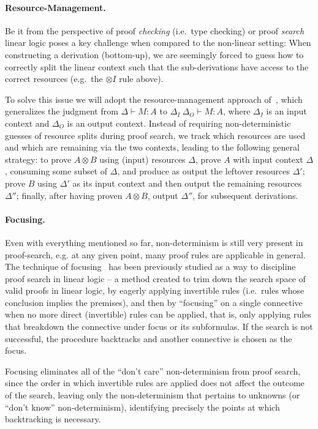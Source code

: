 \documentclass{llncs}
\newcommand{\tensor}{\otimes}
\newcommand{\mypara}[1]{\paragraph{\textbf{#1}.}}
\begin{document}
\mypara{Resource-Management}
Be it from the perspective of proof \emph{checking} (i.e.~type checking) or
proof \emph{search} linear logic poses a key challenge when compared
to the non-linear setting:
When constructing a derivation (bottom-up), we are seemingly forced to
guess how to correctly split the linear context such that the
sub-derivations have access to the correct resources (e.g.~the
$\tensor I$ rule above).
%
%

To solve this issue we will adopt the resource-management
approach
of~\cite{DBLP:journals/tcs/CervesatoHP00,DBLP:conf/lics/LiangM09},
which generalizes the judgment  from $\Delta \vdash M : A$ to
$\Delta_I \ \Delta_O \vdash M : A$, where $\Delta_I$ is an input
context and $\Delta_O$ is an output context.
Instead of requiring non-deterministic guesses of resource splits
during proof search, we track which resources are used and which are
remaining via the two contexts, leading to the following general strategy: to
prove $A\tensor B$ using (input) resources $\Delta$, prove $A$ with
input context $\Delta$,
consuming some subset of $\Delta$, and produce as output the leftover
resources $\Delta'$; prove $B$ using $\Delta'$ as its input context and then output the
remaining resources $\Delta''$; finally, after having proven
$A\tensor B$, output $\Delta''$, for subsequent derivations.


\mypara{Focusing}

Even with everything mentioned so far, non-determinism is still very
present in proof-search, e.g. at any given point, many proof
rules are applicable in general. The technique of focusing~\cite{10.1093/logcom/2.3.297,DBLP:conf/cade/ChaudhuriP05}
has been previously studied as a way to discipline proof search in
linear logic -- a method created to trim down the search space of
valid proofs in linear logic, by eagerly applying invertible rules
(i.e.~rules whose conclusion implies the premises), and then by
``focusing'' on a single connective when no more direct (invertible)
rules can be applied, that is, only applying rules that breakdown
the connective under focus or its subformulas. If the search is not
successful, the procedure backtracks and another connective is
chosen as the focus.

Focusing eliminates all of the ``don't care'' non-determinism from
proof search, since the order in which invertible rules are applied
does not affect the outcome of the search, leaving only the
non-determinism that pertains to unknowns (or ``don't know''
non-determinism), identifying precisely the points at which
backtracking is necessary.




\end{document}
